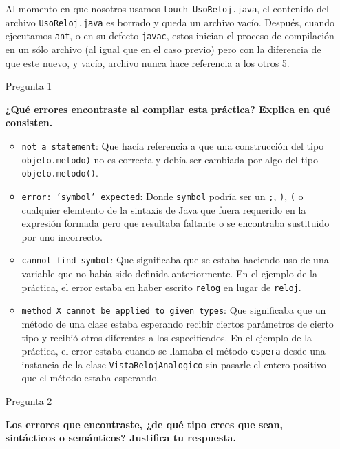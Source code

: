 \documentclass[11pt,letterpaper]{article}
\begin{document}
\begin{enumerate}
        Al momento en que nosotros usamos \texttt{touch UsoReloj.java}, el contenido
        del archivo \texttt{UsoReloj.java} es borrado y queda un archivo vacío. Después,
        cuando ejecutamos \texttt{ant}, o en su defecto \texttt{javac}, estos inician
        el proceso de compilación en un sólo archivo (al igual que en el caso previo) pero
        con la diferencia de que este nuevo, y vacío, archivo nunca hace referencia a
        los otros 5.

    \item [Pregunta 1] {\bfseries ¿Qué errores encontraste al compilar
    esta práctica? Explica en qué consisten.\par}

        \begin{itemize}
            \item \texttt{not a statement}: Que hacía referencia a que una construcción
                del tipo \texttt{objeto.metodo)} no es correcta y debía ser cambiada por
                algo del tipo \texttt{objeto.metodo()}.

            \item \texttt{error: 'symbol' expected}: Donde \texttt{symbol} podría ser
            un \texttt{;}, \texttt{)}, \texttt{(} o cualquier elemtento de la sintaxis
            de Java que fuera requerido en la expresión formada pero que resultaba faltante
            o se encontraba sustituido por uno incorrecto.

            \item \texttt{cannot find symbol}: Que significaba que se estaba haciendo
            uso de una variable que no había sido definida anteriormente. En el ejemplo
            de la práctica, el error estaba en haber escrito \texttt{relog} en lugar de
            \texttt{reloj}.

            \item \texttt{method X cannot be applied to given types}: Que significaba que
            un método de una clase estaba esperando recibir ciertos parámetros de cierto
            tipo y recibió otros diferentes a los especificados. En el ejemplo de la
            práctica, el error estaba cuando se llamaba el método \texttt{espera} desde una
            instancia de la clase \texttt{VistaRelojAnalogico} sin pasarle el entero positivo
            que el método estaba esperando.
        \end{itemize}

    \item [Pregunta 2] {\bfseries Los errores que encontraste, ¿de qué tipo crees que sean,
    sintácticos o semánticos? Justifica tu respuesta. \par}


\end{enumerate}
\end{document}
